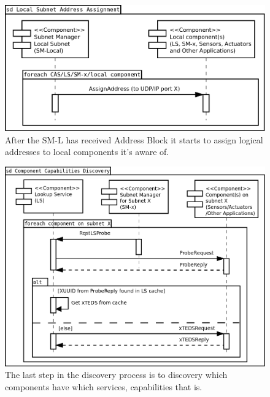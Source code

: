 \begin{figure}[h]
    \centering
    \includegraphics[width=\textwidth]{figures/vn_local_subnet_address_assignment}
    \caption{After the SM-L has received Address Block it starts to assign
    logical addresses to local components it's aware of.}
    \label{fig:appendix_vn_local_subnet_address_assignment}
\end{figure}

\begin{figure}[h]
    \centering
    \includegraphics[width=\textwidth]{figures/vn_component_capabilities_discovery}
    \caption{The last step in the discovery process is to discovery which
    components have which services, capabilities that is.}
    \label{fig:appendix_vn_component_capabilities_discovery}
\end{figure}
